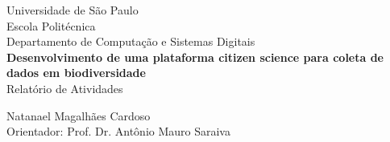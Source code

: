 \begin{titlepage}
  \begin{center}
    Universidade de São Paulo\\
    Escola Politécnica\\
    Departamento de Computação e Sistemas Digitais\\
    
    \vfill
    \large
    \textbf{Desenvolvimento de uma plataforma citizen science para coleta de dados em biodiversidade}\\
    \vspace{.6cm}
    Relatório de Atividades
    
    \vfill
    Natanael Magalhães Cardoso\\
    {\normalsize Orientador:} Prof. Dr. Antônio Mauro Saraiva
    \vspace{2cm}
  \end{center}
\end{titlepage}